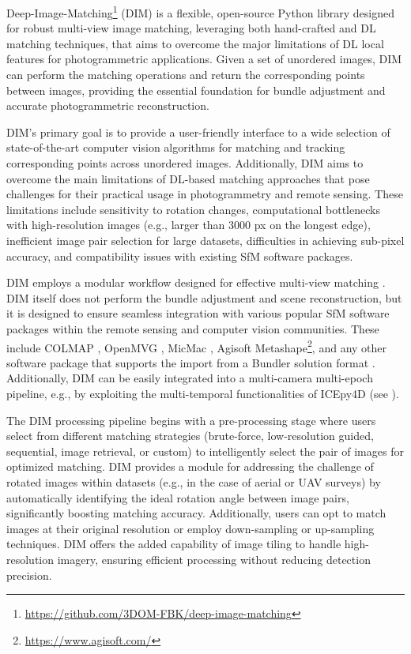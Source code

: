 Deep-Image-Matching\footnote{\url{https://github.com/3DOM-FBK/deep-image-matching}} (DIM) is a flexible, open-source Python library designed for robust multi-view image matching, leveraging both hand-crafted and DL matching techniques, that aims to overcome the major limitations of DL local features for photogrammetric applications.  
Given a set of unordered images, DIM can perform the matching operations and return the corresponding points between images, providing the essential foundation for bundle adjustment and accurate photogrammetric reconstruction.

DIM's primary goal is to provide a user-friendly interface to a wide selection of state-of-the-art computer vision algorithms for matching and tracking corresponding points across unordered images.
Additionally, DIM aims to overcome the main limitations of DL-based matching approaches that pose challenges for their practical usage in photogrammetry and remote sensing. 
These limitations include sensitivity to rotation changes, computational bottlenecks with high-resolution images (e.g., larger than 3000 px on the longest edge), inefficient image pair selection for large datasets, difficulties in achieving sub-pixel accuracy, and compatibility issues with existing SfM software packages.  

DIM employs a modular workflow designed for effective multi-view matching .
DIM itself does not perform the bundle adjustment and scene reconstruction, but it is designed to ensure seamless integration with various popular SfM software packages within the remote sensing and computer vision communities. 
These include COLMAP \citep{schoenberger2016sfm}, OpenMVG \citep{moulon2016openmvg}, MicMac \citep{rupnik2017micmac}, Agisoft Metashape\footnote{\url{https://www.agisoft.com/}}, 
and any other software package that supports the import from a Bundler solution format \citep{Li_Snavely_2018_MegaDepth}.
Additionally, DIM can be easily integrated into a multi-camera multi-epoch pipeline, e.g., by exploiting the multi-temporal functionalities of ICEpy4D (see ).

The DIM processing pipeline begins with a pre-processing stage where users select from different matching strategies (brute-force, low-resolution guided, sequential, image retrieval, or custom) to intelligently select the pair of images for optimized matching. 
DIM provides a module for addressing the challenge of rotated images within datasets (e.g., in the case of aerial or UAV surveys) by automatically identifying the ideal rotation angle between image pairs, significantly boosting matching accuracy.
Additionally, users can opt to match images at their original resolution or employ down-sampling or up-sampling techniques.
DIM offers the added capability of image tiling to handle high-resolution imagery, ensuring efficient processing without reducing detection precision. 

